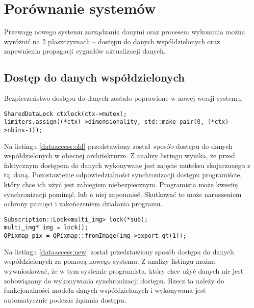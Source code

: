 \section{Porównanie systemów}
Przewagę nowego systemu zarządzania danymi oraz procesem wykonania można wyróżnić na 2 płaszczyznach -- dostępu do danych współdzielonych oraz zapewnienia propagacji sygnałów aktualizacji danych.

\subsection{Dostęp do danych współdzielonych}

Bezpieczeństwo dostępu do danych zostało poprawione w nowej wersji systemu.

\begin{minipage}{\textwidth}
	\begin{lstlisting}[label=dataaccess:old, caption={Przykład dostępu do danych według bieżącego systemu},alsoletter={()[].=}]
SharedDataLock ctxlock(ctx->mutex);
limiters.assign((*ctx)->dimensionality, std::make_pair(0, (*ctx)->nbins-1));
	\end{lstlisting}
\end{minipage}

Na listingu \ref{dataaccess:old} przedstawiony został sposób dostępu do danych współdzielonych w obecnej architekturze. Z analizy listingu wynika, że przed faktycznym dostępem do danych wykonywane jest zajęcie muteksu skojarzonego z tą daną. Pozostawienie odpowiedzialności synchronizacji dostępu programiście, który chce ich użyć jest zabiegiem niebezpiecznym. Programista może kwestię synchronizacji pominąć, lub o niej zapomnieć. Skutkować to może naruszeniem ochrony pamięci i zakończeniem działania programu.

\begin{minipage}{\textwidth}
	\begin{lstlisting}[label=dataaccess:new, caption={Przykład dostępu do danych według nowego systemu},alsoletter={()[].=}]
Subscription::Lock<multi_img> lock(*sub);
multi_img* img = lock();
QPixmap pix = QPixmap::fromImage(img->export_qt(1));
	\end{lstlisting}
\end{minipage}

Na listingu \ref{dataaccess:new} został przedstawiony sposób dostępu do danych współdzielonych za pomocą nowego systemu. Z analizy listingu można wywnioskować, że w tym systemie programista, który chce użyć danych nie jest zobowiązany do wykonywania synchronizacji dostępu. Rzecz ta należy do funkcjonalności modelu danych współdzielonych i wykonywana jest automatycznie podczas żądania dostępu.

